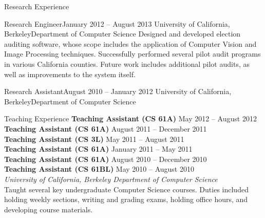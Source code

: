 \documentclass{resume}
\begin{document}
\vspace{0.5em}

\begin{component}{Research Experience}
    \begin{position}{Research Engineer}{January 2012 -- August 2013}
        {University of California, Berkeley}{Department of Computer Science}
    {Designed and developed election auditing software, whose scope includes the application of Computer Vision and Image Processing techniques. Successfully performed several pilot audit programs in various California counties. Future work includes additional pilot audits, as well as improvements to the system itself.}
    \end{position}
    
    \begin{position}{Research Assistant}{August 2010 -- January 2012}
        {University of California, Berkeley}{Department of Computer Science}
    {}
    \end{position}
\end{component}

\vspace{-1.5em}

\begin{component}{Teaching Experience}
    \textbf{Teaching Assistant (CS 61A)} \hfill May 2012 -- August 2012 \\
    \textbf{Teaching Assistant (CS 61A)} \hfill August 2011 -- December 2011 \\
    \textbf{Teaching Assistant (CS 3L)} \hfill May 2011 -- August 2011 \\
    \textbf{Teaching Assistant (CS 61A)} \hfill January 2011 -- May 2011 \\
    \textbf{Teaching Assistant (CS 61A)} \hfill August 2010 -- December 2010 \\
    \textbf{Teaching Assistant (CS 61BL)} \hfill May 2010 -- August 2010 \\
        \textit{University of California, Berkeley \hfill Department of Computer Science}\\
    Taught several key undergraduate Computer Science courses. Duties included holding weekly sections, writing and grading exams, holding office hours, and developing course materials.
\end{component}

\vspace{0.5em}
\end{document}
